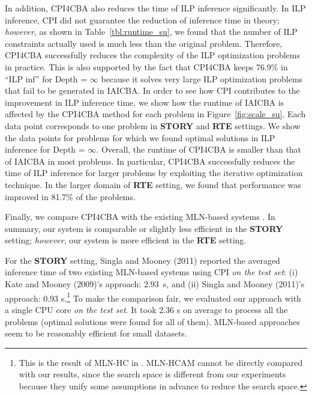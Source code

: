 \documentclass[english]{jnlp_1.4}
\begin{document}
In addition, CPI4CBA also reduces the time of ILP inference
significantly.  In ILP inference, CPI did not guarantee the reduction
of inference time in theory; \emph{however}, 
as shown in Table~\ref{tbl:runtime_su}, we found that the number of ILP constraints
actually used is much less than the original problem. Therefore,
CPI4CBA successfully reduces the complexity of the ILP optimization
problems in practice. This is also supported by the fact that CPI4CBA
keeps 76.9\% in ``ILP inf'' for Depth = $\infty$ because it solves
very large ILP optimization problems that fail to be generated in
IAICBA. In order to see how CPI contributes to the improvement in ILP
inference time, we show how the runtime of IAICBA is affected by
the CPI4CBA method for each problem in Figure~\ref{fig:scale_su}. Each
data point corresponds to one problem in \textbf{STORY} and
\textbf{RTE} settings. We show the data points for problems for which we
found optimal solutions in ILP inference for Depth =
$\infty$. Overall, the runtime of CPI4CBA is smaller than that of IAICBA in
most problems. In particular, CPI4CBA successfully
reduces the time of ILP inference for larger problems by exploiting
the iterative optimization technique. In the larger domain of
\textbf{RTE} setting, we found that performance was improved in
81.7\% of the problems.

Finally, we compare CPI4CBA with the existing MLN-based systems
\cite{Kate09,Singla11,Blythe11}. In summary, our system is comparable or
slightly less efficient in the \textbf{STORY} setting; \emph{however}, our
system is more efficient in the \textbf{RTE} setting.

For the \textbf{STORY} setting, Singla and Mooney
(2011)\nocite{Singla11} reported the averaged inference time of two
existing MLN-based systems using CPI \cite{Riedel08}
\emph{on the test set}:
(i) Kate and Mooney (2009)\nocite{Kate09}'s approach: 2.93~s, and (ii)
Singla and Mooney (2011)\nocite{Singla11}'s approach: 0.93
s.\footnote{This is the result of MLN-HC in
  \cite{Singla11}. MLN-HCAM cannot be directly compared with our
  results, since the search space is different from our experiments
  because they unify some assumptions in advance to reduce the search
  space.} To make the comparison fair, we evaluated our approach with
a single CPU core \emph{on the test set}. It took 2.36
s on average to process all the problems (optimal solutions were found for
all of them).
MLN-based approaches seem to be reasonably efficient for small
datasets.
\end{document}
